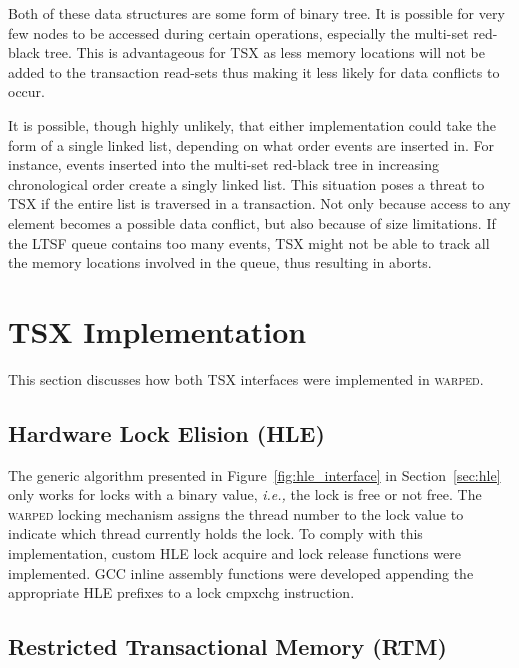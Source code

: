 \documentclass[11pt]{book}
\begin{document}
Both of these data structures are some form of binary tree.  It is possible for
very few nodes to be accessed during certain operations, especially the
multi-set red-black tree.  This is advantageous for TSX as less memory locations
will not be added to the transaction read-sets thus making it less likely for
data conflicts to occur.   

It is possible, though highly unlikely, that either implementation could take
the form of a single linked list, depending on what order events are inserted
in.  For instance, events inserted into the multi-set red-black tree in
increasing chronological order create a singly linked list. This situation poses
a threat to TSX if the entire list is traversed in a transaction.  Not only
because access to any element becomes a possible data conflict, but also because
of size limitations.  If the LTSF queue contains too many events, TSX might not
be able to track all the memory locations involved in the queue, thus resulting
in aborts.

\section{TSX Implementation}

This section discusses how both TSX interfaces were implemented in \textsc{warped}.

\subsection{Hardware Lock Elision (HLE)}

The generic algorithm presented in Figure~\ref{fig:hle_interface} in Section~\ref{sec:hle}
only works for locks with a binary value, \emph{i.e.,} the lock is free or not free.  The
\textsc{warped} locking mechanism assigns the thread number to the lock value to indicate
which thread currently holds the lock.  To comply with this implementation, custom HLE
lock acquire and lock release functions were implemented.  GCC inline assembly functions
were developed appending the appropriate HLE prefixes to a lock cmpxchg instruction.

\subsection{Restricted Transactional Memory (RTM)}
\end{document}
